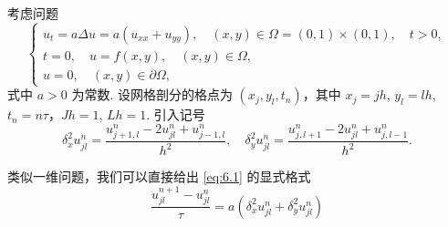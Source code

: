 考虑问题
\begin{equation}\label{eq:6.1}
    \begin{cases}
        u_t = a\Delta u = a(u_{xx} + u_{yy}), \quad (x, y) \in \Omega = (0, 1) \times (0, 1), \quad t > 0, \\
        t = 0, \quad u = f(x, y), \quad (x, y) \in \Omega, \\
        u = 0, \quad (x, y) \in \partial\Omega,
    \end{cases}
\end{equation}
式中 $a > 0$ 为常数. 设网格剖分的格点为 $(x_j, y_l, t_n)$，其中 $x_j = jh$, $y_l = lh$, $t_n = n\tau$，$Jh = 1$, $Lh = 1$. 引入记号
\begin{equation*}
    \delta_x^2 u_{jl}^n = \frac{u_{j+1,l}^n - 2u_{jl}^n + u_{j-1,l}^n}{h^2}, \quad \delta_y^2 u_{jl}^n = \frac{u_{j,l+1}^n - 2u_{jl}^n + u_{j,l-1}^n}{h^2}.
\end{equation*}

类似一维问题，我们可以直接给出 \eqref{eq:6.1} 的显式格式
\begin{equation*}
    \frac{u_{jl}^{n+1} - u_{jl}^n}{\tau} = a\left(\delta_x^2 u_{jl}^n + \delta_y^2 u_{jl}^n\right)
\end{equation*}


